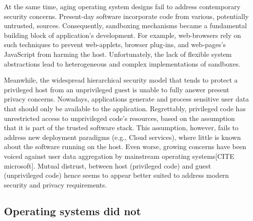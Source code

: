 At the same time, aging operating system designs fail to address contemporary security concerns.
Present-day software incorporate code from various, potentially untrusted, sources.
Consequently, sandboxing mechanisms became a fundamental building block of application's development.
For example, web-browsers rely on such techniques to prevent web-applets, browser plug-ins, and web-pages's JavaScript from harming the host.
Unfortunately, the lack of flexible system abstractions lead to heterogeneous and complex implementations of sandboxes.


Meanwhile, the widespread hierarchical security model that tends to protect a privileged host from an unprivileged guest is unable to fully answer present privacy concerns.
Nowadays, applications generate and process sensitive user data that should only be available to the application.
Regrettably, privileged code has unrestricted access to unprivileged code's resources, based on the assumption that it is part of the trusted software stack.
This assumption, however, fails to address new deployment paradigms (e.g., Cloud services), where little is known about the software running on the host.
Even worse, growing concerns have been voiced against user data aggregation by mainstream operating systems[CITE microsoft].
Mutual distrust, between host (privileged code) and guest (unprivileged code) hence seems to appear better suited to address modern security and privacy requirements. 



\subsection{Operating systems did not}

